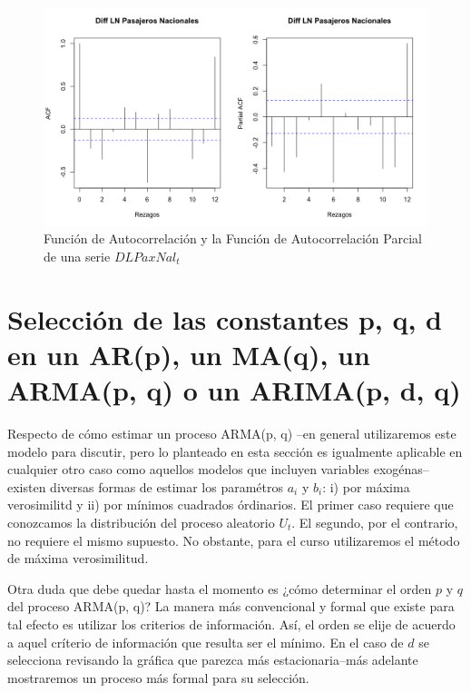 \documentclass[
]{book}
\begin{document}
\begin{figure}

{\centering \includegraphics[width=0.95\linewidth]{Plots/G_ACF_PACF} 

}

\caption{Función de Autocorrelación y la Función de Autocorrelación Parcial de una serie $DLPaxNal_t$}\label{fig:fig414}
\end{figure}

\hypertarget{selecciuxf3n-de-las-constantes-p-q-d-en-un-arp-un-maq-un-armap-q-o-un-arimap-d-q}{%
\section{Selección de las constantes p, q, d en un AR(p), un MA(q), un ARMA(p, q) o un ARIMA(p, d, q)}\label{selecciuxf3n-de-las-constantes-p-q-d-en-un-arp-un-maq-un-armap-q-o-un-arimap-d-q}}

Respecto de cómo estimar un proceso ARMA(p, q) --en general utilizaremos este modelo para discutir, pero lo planteado en esta sección es igualmente aplicable en cualquier otro caso como aquellos modelos que incluyen variables exogénas-- existen diversas formas de estimar los paramétros \(a_i\) y \(b_i\): i) por máxima verosimilitd y ii) por mínimos cuadrados órdinarios. El primer caso requiere que conozcamos la distribución del proceso aleatorio \(U_t\). El segundo, por el contrario, no requiere el mismo supuesto. No obstante, para el curso utilizaremos el método de máxima verosimilitud.

Otra duda que debe quedar hasta el momento es ¿cómo determinar el orden \(p\) y \(q\) del proceso ARMA(p, q)? La manera más convencional y formal que existe para tal efecto es utilizar los criterios de información. Así, el orden se elije de acuerdo a aquel críterio de información que resulta ser el mínimo. En el caso de \(d\) se selecciona revisando la gráfica que parezca más estacionaria--más adelante mostraremos un proceso más formal para su selección.
\end{document}
